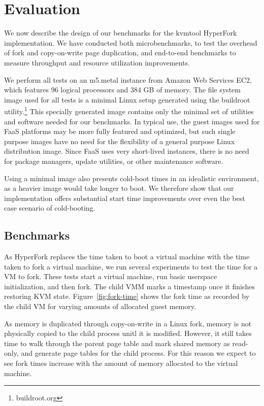 \section{Evaluation} \label{sec:evaluation} We now describe the
design of our benchmarks for the kvmtool HyperFork implementation. We have
conducted both microbenchmarks, to test the overhead of fork and copy-on-write
page duplication, and end-to-end benchmarks to measure throughput and resource
utilization improvements.

We perform all tests on an m5.metal instance from Amazon Web Services EC2,
which features 96 logical processors and 384 GB of memory. The file system
image used for all tests is a minimal Linux setup generated using the buildroot
utility.\footnote{buildroot.org} This specially generated image contains only
the minimal set of utilities and software needed for our benchmarks. In typical
use, the guest images used for FaaS platforms may be more fully featured and
optimized, but such single purpose images have no need for the flexibility of a
general purpose Linux distribution image. Since FaaS uses very short-lived
instances, there is no need for package managers, update utilities, or other
maintenance software.

Using a minimal image also presents cold-boot times in an idealistic
environment, as a heavier image would take longer to boot. We therefore show
that our implementation offers substantial start time improvements over even
the best case scenario of cold-booting.

\subsection{Benchmarks}

 As HyperFork replaces the time taken to boot a virtual
machine with the time taken to fork a virtual machine, we run several
experiments to test the time for a VM to fork. These tests start a virtual
machine, run basic userspace initialization, and then fork. The child VMM marks
a timestamp once it finishes restoring KVM state. Figure~\ref{fig:fork-time}
shows the fork time as recorded by the child VM for varying amounts of
allocated guest memory.

As memory is duplicated through copy-on-write in a Linux fork, memory is not
physically copied to the child process unitl it is modified. However, it still
takes time to walk through the parent page table and mark shared memory as
read-only, and generate page tables for the child process. For this reason we
expect to see fork times increase with the amount of memory allocated to the
virtual machine.

